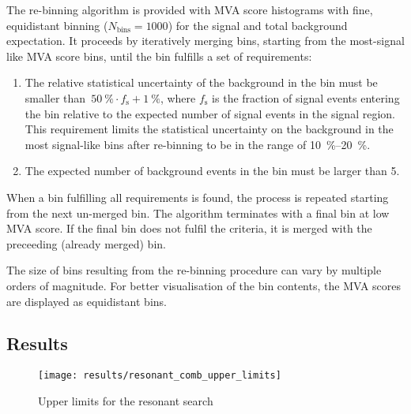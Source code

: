 The re-binning algorithm is provided with MVA score histograms with
fine, equidistant binning ($N_\text{bins} = 1000$) for the signal and
total background expectation. It proceeds by iteratively merging bins,
starting from the most-signal like MVA score bins, until the bin
fulfills a set of requirements:
\begin{enumerate}

\item The relative statistical uncertainty of the background in the
  bin must be smaller
  than~\mbox{$\SI{50}{\percent} \cdot f_\text{s} + \SI{1}{\percent}$},
  where $f_\text{s}$ is the fraction of signal events entering the bin
  relative to the expected number of signal events in the signal
  region. This requirement limits the statistical uncertainty on the
  background in the most signal-like bins after re-binning to be in
  the range of \SIrange{10}{20}{\percent}.

\item The expected number of background events in the bin must be
  larger than 5.

\end{enumerate}
When a bin fulfilling all requirements is found, the process is
repeated starting from the next un-merged bin. The algorithm
terminates with a final bin at low MVA score. If the final bin does
not fulfil the criteria, it is merged with the preceeding (already
merged) bin.




The size of bins resulting from the re-binning procedure can vary by
multiple orders of magnitude. For better visualisation of the bin
contents, the MVA scores are displayed as equidistant bins.


\subsection{Results}

\begin{figure}[htbp]
  \centering

  \texttt{[image: results/resonant\_comb\_upper\_limits]}

  \caption{Upper limits for the resonant search}
  \label{fig:res_upper_limits}
\end{figure}

